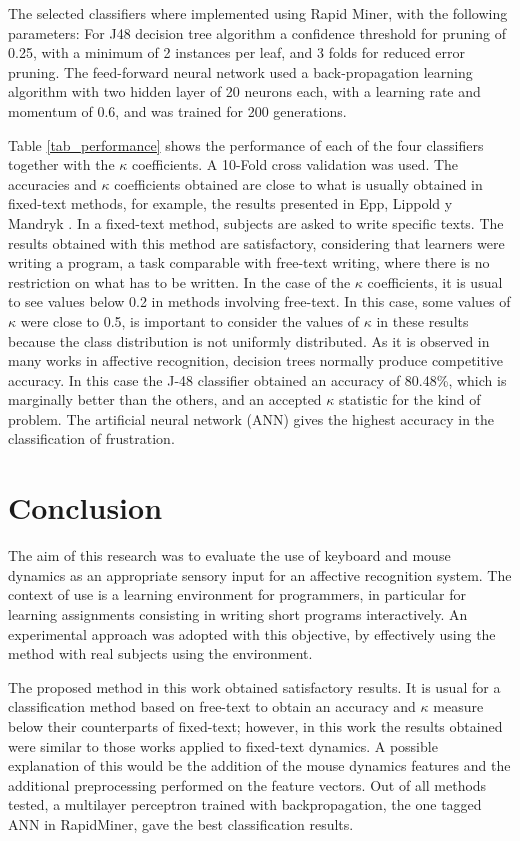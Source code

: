 \documentclass[a4paper,twoside]{article}
\begin{document}
The selected classifiers where implemented using Rapid Miner, with the following parameters:
For J48 decision tree algorithm a confidence threshold for pruning of 0.25, with a
minimum of 2 instances per leaf, and 3 folds for reduced error pruning. The feed-forward 
neural network used a back-propagation learning algorithm with two hidden layer of 20 neurons
each, with a learning rate and momentum of 0.6, and was trained for 200 generations.

Table \ref{tab_performance} shows the performance of each of the four classifiers together 
with the $\kappa$ coefficients. A 10-Fold cross validation was used. 
The accuracies and $\kappa$ coefficients obtained are close to what is
usually obtained in fixed-text methods, for example, the results presented in
Epp, Lippold y Mandryk \cite{epp2011identifying}. 	
In a fixed-text method, subjects are asked to write specific texts.											 
The results obtained with this method are satisfactory, considering that learners
were writing a program, a task comparable with free-text writing, where there
is no restriction on what has to be written. 
In the case of the $\kappa$ coefficients, it is
usual to see values below 0.2 in methods involving free-text. In this case, some
values of $\kappa$ were close to 0.5, is important to consider the values of $\kappa$
in these results because the class distribution is not uniformly distributed. As
it is observed in many works in affective recognition, decision trees normally
produce competitive accuracy. In this case the J-48 classifier obtained an
accuracy of 80.48\%, which is marginally better than the others, and an accepted $\kappa$
statistic for the kind of problem. The artificial neural network (ANN)
gives the highest
accuracy in the classification of frustration.

 
\section{Conclusion}

The aim of this research was to evaluate the use of keyboard and mouse dynamics 
as an appropriate sensory input for an affective recognition system. The context
of use is a learning environment for programmers, in particular for learning
assignments consisting in writing short programs interactively. An experimental
approach was adopted with this objective, by effectively using the
method with real subjects using the environment.

The proposed method in this work obtained
satisfactory results. It is usual for a classification method based on free-text
to obtain an accuracy and $\kappa$ measure below their counterparts of
fixed-text; however, in this
work the results obtained were similar to those works applied to fixed-text 
dynamics. A possible explanation of this would be the addition of the mouse 
dynamics features and the additional preprocessing performed on the
feature vectors. Out of all methods tested, a multilayer perceptron
trained with backpropagation, the one tagged ANN in RapidMiner,  gave the best classification
results. 
\end{document}
